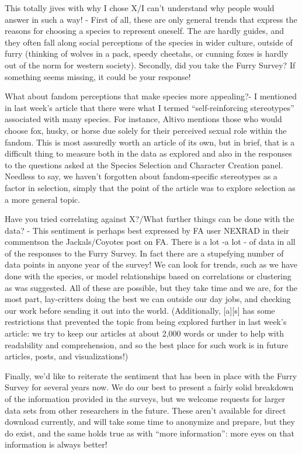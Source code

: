 This totally jives with why I chose X/I can't understand why people would answer in such a way! - First of all, these are only general trends that express the reasons for choosing a species to represent oneself. The are hardly guides, and they often fall along social perceptions of the species in wider culture, outside of furry (thinking of wolves in a pack, speedy cheetahs, or cunning foxes is hardly out of the norm for western society). Secondly, did you take the Furry Survey? If something seems missing, it could be your response!

What about fandom perceptions that make species more appealing?- I mentioned in last week's article that there were what I termed ``self-reinforcing stereotypes'' associated with many species. For instance, Altivo mentions those who would choose fox, husky, or horse due solely for their perceived sexual role within the fandom. This is most assuredly worth an article of its own, but in brief, that is a difficult thing to measure both in the data as explored and also in the responses to the questions asked at the Species Selection and Character Creation panel. Needless to say, we haven't forgotten about fandom-specific stereotypes as a factor in selection, simply that the point of the article was to explore selection as a more general topic.

Have you tried correlating against X?/What further things can be done with the data? - This sentiment is perhaps best expressed by FA user NEXRAD in their commentson the Jackals/Coyotes post on FA. There is a lot -a lot - of data in all of the responses to the Furry Survey. In fact there are a stupefying number of data points in anyone year of the survey! We can look for trends, such as we have done with the species, or model relationships based on correlations or clustering as was suggested. All of these are possible, but they take time and we are, for the most part, lay-critters doing the best we can outside our day jobs, and checking our work before sending it out into the world. (Additionally, {[}a{]}{[}s{]} has some restrictions that prevented the topic from being explored further in last week's article: we try to keep our articles at about 2,000 words or under to help with readability and comprehension, and so the best place for such work is in future articles, posts, and visualizations!)

Finally, we'd like to reiterate the sentiment that has been in place with the Furry Survey for several years now. We do our best to present a fairly solid breakdown of the information provided in the surveys, but we welcome requests for larger data sets from other researchers in the future. These aren't available for direct download currently, and will take some time to anonymize and prepare, but they do exist, and the same holds true as with ``more information'': more eyes on that information is always better!

